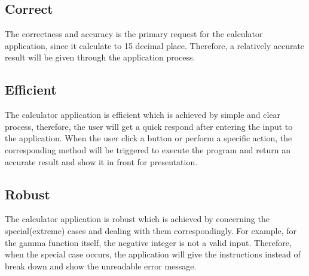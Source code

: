 \documentclass[a4paper, 11pt]{article}
\begin{document}
\subsection{Correct}
\indent\indent The correctness and accuracy is the primary request for the calculator application, since it calculate to 15 decimal place. Therefore, a relatively accurate result will be given through the application process.
\subsection{Efficient}
\indent\indent The calculator application is efficient which is achieved by simple and clear process, therefore, the user will get a quick respond after entering the input to the application.
When the user click a button or perform a specific action, the corresponding method will be triggered to execute the program and return an accurate result and show it in front for presentation.

\subsection{Robust}
\indent\indent The calculator application is robust which is achieved by concerning the special(extreme) cases and dealing with them correspondingly. For example, for the gamma function itself, the negative integer is not a valid input. Therefore, when the special case occurs, the application will give the instructions instead of break down and show the unreadable error message.
\end{document}
